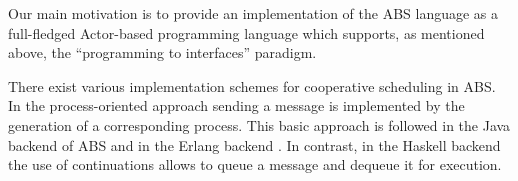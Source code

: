 Our main motivation is to provide an implementation of the ABS language  as a full-fledged Actor-based programming language which supports,
as mentioned above,  the ``programming to interfaces'' paradigm.

There exist various implementation schemes for cooperative scheduling in ABS.
In the process-oriented approach sending a message  is implemented by the generation of a  corresponding process. This basic approach is followed in the Java backend of ABS \cite{abs,Schafer} and in the Erlang backend \cite{Erlang}.
In contrast, in the Haskell backend \cite{Haskell}  the use of continuations allows
to queue  a message and dequeue it for execution.





